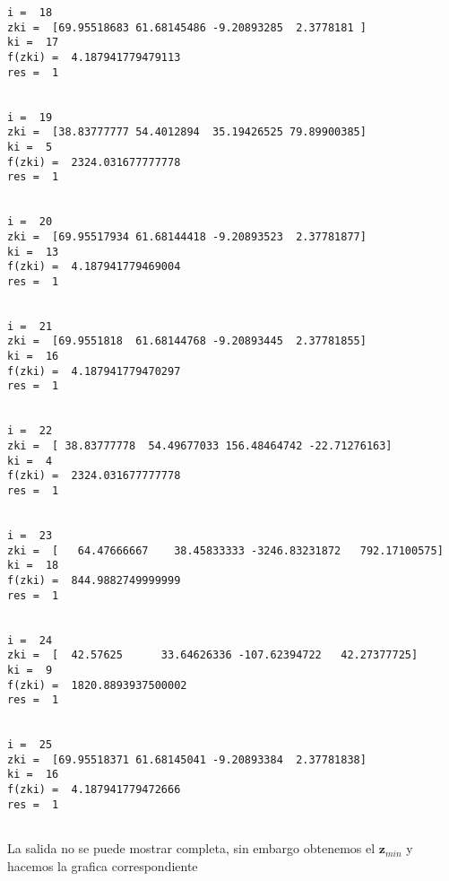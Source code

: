 \documentclass[11pt]{article}
\begin{document}
\begin{Verbatim}[commandchars=\\\{\}]
i =  18
zki =  [69.95518683 61.68145486 -9.20893285  2.3778181 ]
ki =  17
f(zki) =  4.187941779479113
res =  1


i =  19
zki =  [38.83777777 54.4012894  35.19426525 79.89900385]
ki =  5
f(zki) =  2324.031677777778
res =  1


i =  20
zki =  [69.95517934 61.68144418 -9.20893523  2.37781877]
ki =  13
f(zki) =  4.187941779469004
res =  1


i =  21
zki =  [69.9551818  61.68144768 -9.20893445  2.37781855]
ki =  16
f(zki) =  4.187941779470297
res =  1


i =  22
zki =  [ 38.83777778  54.49677033 156.48464742 -22.71276163]
ki =  4
f(zki) =  2324.031677777778
res =  1


i =  23
zki =  [   64.47666667    38.45833333 -3246.83231872   792.17100575]
ki =  18
f(zki) =  844.9882749999999
res =  1


i =  24
zki =  [  42.57625      33.64626336 -107.62394722   42.27377725]
ki =  9
f(zki) =  1820.8893937500002
res =  1


i =  25
zki =  [69.95518371 61.68145041 -9.20893384  2.37781838]
ki =  16
f(zki) =  4.187941779472666
res =  1


    \end{Verbatim}

    La salida no se puede mostrar completa, sin embargo obtenemos el
\(\mathbf{z}_{min}\) y hacemos la grafica correspondiente
\end{document}
